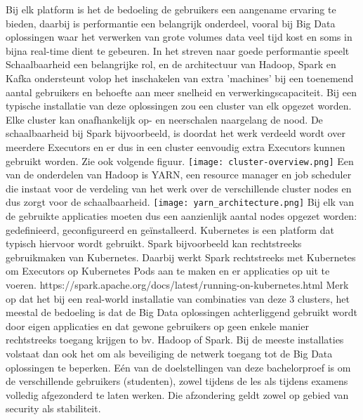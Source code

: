 Bij elk platform is het de bedoeling de gebruikers een aangename ervaring te bieden, daarbij is performantie een belangrijk onderdeel, vooral bij Big Data oplossingen waar het verwerken van grote volumes data veel tijd kost en soms in bijna real-time dient te gebeuren.
In het streven naar goede performantie speelt Schaalbaarheid een belangrijke rol, en de architectuur van Hadoop, Spark en Kafka ondersteunt volop het inschakelen van extra 'machines' bij een toenemend aantal gebruikers en behoefte aan meer snelheid en verwerkingscapaciteit.
Bij een typische installatie van deze oplossingen zou een cluster van elk opgezet worden. Elke cluster kan onafhankelijk op- en neerschalen naargelang de nood.
\newline
\newline
De schaalbaarheid bij Spark bijvoorbeeld, is doordat het werk verdeeld wordt over meerdere Executors en er dus in een cluster eenvoudig extra Executors kunnen gebruikt worden. Zie ook volgende figuur.
\newline
\texttt{[image: cluster-overview.png]}
\newline
Een van de onderdelen van Hadoop is YARN, een resource manager en job scheduler die instaat voor de verdeling van het werk over de verschillende cluster nodes en dus zorgt voor de schaalbaarheid.
\newline
\texttt{[image: yarn\_architecture.png]}
\newline
Bij elk van de gebruikte applicaties moeten dus een aanzienlijk aantal nodes opgezet worden: gedefinieerd, geconfigureerd en geïnstalleerd. Kubernetes is een platform dat typisch hiervoor wordt gebruikt. Spark bijvoorbeeld kan rechtstreeks gebruikmaken van Kubernetes. Daarbij werkt Spark rechtstreeks met Kubernetes om Executors op Kubernetes Pods aan te maken en er applicaties op uit te voeren.
\newline
https://spark.apache.org/docs/latest/running-on-kubernetes.html
\newline
\newline
Merk op dat het bij een real-world installatie van combinaties van deze 3 clusters, het meestal de bedoeling is dat de Big Data oplossingen achterliggend gebruikt wordt door eigen applicaties en dat gewone gebruikers op geen enkele manier rechtstreeks toegang krijgen to bv. Hadoop of Spark. Bij de meeste installaties volstaat dan ook het om als beveiliging de netwerk toegang tot de Big Data oplossingen te beperken.
\newline
\newline
Eén van de doelstellingen van deze bachelorproef is om de verschillende gebruikers (studenten), zowel tijdens de les als tijdens examens volledig afgezonderd te laten werken. Die afzondering geldt zowel op gebied van security als stabiliteit.

